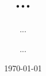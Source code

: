\documentclass[11pt,french,a4paper,twoside]{article}  %
\title[<short?>]{...}
\author[<short?>]{... \and ...}
\date[<short?>]{\today{}}
\begin{document}
\maketitle

\tableofcontents

\part{}

\section{}
\subsection{}
\subsubsection{}
\end{document}
